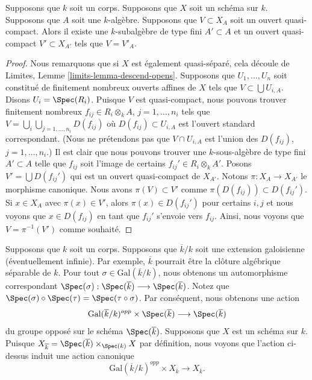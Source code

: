 \begin{lemma}
\label{lemma-descend-open}
Supposons que $k$ soit un corps. Supposons
que $X$ soit un schéma sur $k$. Supposons
que $A$ soit une $k$-algèbre. Supposons que
$V \subset X_A$ soit un ouvert
quasi-compact. Alors il existe une
$k$-subalgèbre de type fini $A' \subset A$ et un ouvert
quasi-compact $V' \subset X_{A'}$ tels que $V = V'_A$.
\end{lemma}

\begin{proof}
Nous remarquons que si $X$ est également quasi-séparé, cela
découle de Limites, Lemme \ref{limits-lemma-descend-opens}.
Supposons que $U_1, \ldots, U_n$ soit constitué de finitement
nombreux ouverts affines de $X$ tels que $V \subset \bigcup U_{i,
A}$. Disons $U_i = \Spec(R_i)$. Puisque $V$ est quasi-compact,
nous pouvons trouver finitement nombreux $f_{ij} \in R_i
\otimes_k A$, $j = 1, \ldots, n_i$ tels que $V = \bigcup_i
\bigcup_{j = 1, \ldots, n_i} D(f_{ij})$ où $D(f_{ij}) \subset U_{i,
A}$ est l'ouvert standard correspondant. (Nous ne prétendons pas
que $V \cap U_{i, A}$ est l'union des $D(f_{ij})$, $j = 1, \ldots,
n_i$.) Il est clair que nous pouvons trouver une $k$-sous-algèbre
de type fini $A' \subset A$ telle que $f_{ij}$ soit l'image de
certains $f_{ij}' \in R_i \otimes_k A'$. Posons $V' = \bigcup
D(f_{ij}')$ qui est un ouvert quasi-compact de $X_{A'}$. Notons $\pi
: X_A \to X_{A'}$ le morphisme canonique. Nous avons $\pi(V) \subset
V'$ comme $\pi(D(f_{ij})) \subset D(f_{ij}')$. Si $x \in X_A$ avec
$\pi(x) \in V'$, alors $\pi(x) \in D(f_{ij}')$ pour certains $i, j$
et nous voyons que $x \in D(f_{ij})$ en tant que $f_{ij}'$ s'envoie
vers $f_{ij}$. Ainsi, nous voyons que $V = \pi^{-1}(V')$ comme souhaité.
\end{proof}

\noindent
Supposons que $k$ soit un corps.
Supposons que $\overline{k}/k$ soit
une extension galoisienne
(éventuellement infinie). Par
exemple, $\overline{k}$ pourrait
être la clôture algébrique séparable
de $k$. Pour tout $\sigma \in
\text{Gal}(\overline{k}/k)$, nous
obtenons un automorphisme
correspondant $ \Spec(\sigma) :
\Spec(\overline{k}) \longrightarrow
\Spec(\overline{k}) $. Notez que
$\Spec(\sigma) \circ \Spec(\tau) = \Spec(\tau \circ
\sigma)$. Par conséquent, nous obtenons une action
$$
\text{Gal}(\overline{k}/k)^{opp} \times \Spec(\overline{k})
\longrightarrow
\Spec(\overline{k})
$$
du groupe opposé sur le schéma
$\Spec(\overline{k})$. Supposons que $X$ est un
schéma sur $k$. Puisque $X_{\overline{k}} =
\Spec(\overline{k}) \times_{\Spec(k)} X$ par définition,
nous voyons que l'action ci-dessus induit une action canonique
\begin{equation}
\label{equation-galois-action-base-change-kbar}
\text{Gal}(\overline{k}/k)^{opp} \times X_{\overline{k}}
\longrightarrow
X_{\overline{k}}.
\end{equation}

